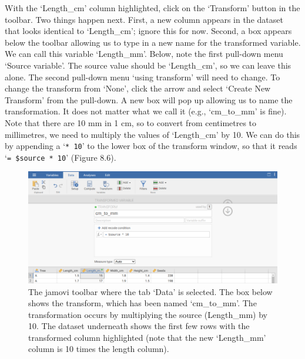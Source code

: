 \documentclass[
  openany]{krantz}
\begin{document}
With the `Length\_cm' column highlighted, click on the `Transform' button in the toolbar.
Two things happen next.
First, a new column appears in the dataset that looks identical to `Length\_cm'; ignore this for now.
Second, a box appears below the toolbar allowing us to type in a new name for the transformed variable.
We can call this variable `Length\_mm'.
Below, note the first pull-down menu `Source variable'.
The source value should be `Length\_cm', so we can leave this alone.
The second pull-down menu `using transform' will need to change.
To change the transform from `None', click the arrow and select `Create New Transform' from the pull-down.
A new box will pop up allowing us to name the transformation.
It does not matter what we call it (e.g., `cm\_to\_mm' is fine).
Note that there are 10 mm in 1 cm, so to convert from centimetres to millimetres, we need to multiply the values of `Length\_cm' by 10.
We can do this by appending a `\texttt{*\ 10}' to the lower box of the transform window, so that it reads `\texttt{=\ \$source\ *\ 10}' (Figure 8.6).

\begin{figure}
\includegraphics[width=1\linewidth]{img/jamovi_transform_cm_to_mm} \caption{The jamovi toolbar where the tab `Data' is selected. The box below shows the transform, which has been named `cm\_to\_mm'. The transformation occurs by multiplying the source (Length\_mm) by 10. The dataset underneath shows the first few rows with the transformed column highlighted (note that the new `Length\_mm' column is 10 times the length column).}\label{fig:unnamed-chunk-31}
\end{figure}
\end{document}
